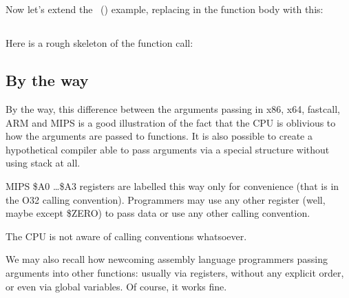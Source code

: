 \chapter{\PrintfSeveralArgumentsSectionName}

Now let's extend the \IT{\HelloWorldSectionName}~() example, replacing \printf in
the \main function body with this:




\ifdefined\IncludeARM

\fi
\ifdefined\IncludeMIPS

\fi

\section{\Conclusion{}}

Here is a rough skeleton of the function call:





\ifdefined\IncludeGCC

\fi

\ifdefined\IncludeARM



\fi

\ifdefined\IncludeMIPS
{}

\fi

\section{By the way}

By the way, this difference between the arguments passing in x86, x64, 
fastcall, ARM and MIPS is a good illustration of the fact that the CPU is oblivious to how the arguments are passed to functions. 
It is also possible to create a hypothetical compiler able to pass arguments 
via a special structure without using stack at all.

\ifdefined\IncludeMIPS
{}
MIPS \$A0 \dots \$A3 registers are labelled this way only for convenience (that is in the O32 calling convention).
Programmers may use any other register (well, maybe except \$ZERO) 
to pass data or use any other calling convention.
\fi

The \ac{CPU} is not aware of calling conventions whatsoever.

We may also recall how newcoming assembly language programmers passing arguments into
other functions:
usually via registers, without any explicit order, or even via global variables.
Of course, it works fine.

